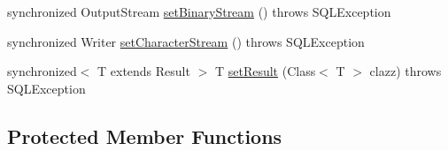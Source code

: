 \begin{DoxyCompactItemize}
\item 
synchronized Output\+Stream \mbox{\hyperlink{classcom_1_1mysql_1_1jdbc_1_1_j_d_b_c4_mysql_s_q_l_x_m_l_a048031448277a2530b56d1f29116e81c}{set\+Binary\+Stream}} ()  throws S\+Q\+L\+Exception 
\item 
synchronized Writer \mbox{\hyperlink{classcom_1_1mysql_1_1jdbc_1_1_j_d_b_c4_mysql_s_q_l_x_m_l_aeec23a2185a984b32e55942c2554a9f7}{set\+Character\+Stream}} ()  throws S\+Q\+L\+Exception 
\item 
synchronized$<$ T extends Result $>$ T \mbox{\hyperlink{classcom_1_1mysql_1_1jdbc_1_1_j_d_b_c4_mysql_s_q_l_x_m_l_af9a1ac7df0bf58011e4e8ab1e2ed1348}{set\+Result}} (Class$<$ T $>$ clazz)  throws S\+Q\+L\+Exception 
\end{DoxyCompactItemize}
\subsection*{Protected Member Functions}
